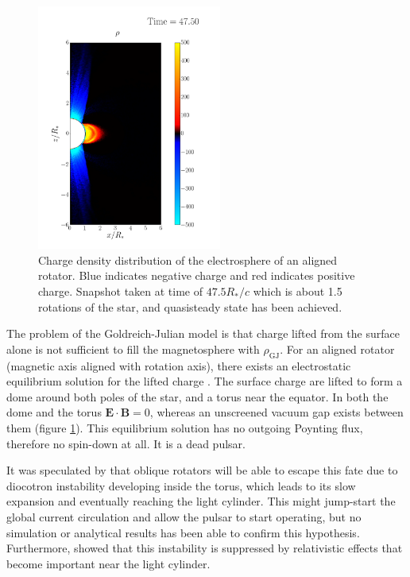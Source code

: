 \begin{figure}[h]
  \centering
  \includegraphics[width=0.54\textwidth]{pics/intro/electrosphere-new.png}
  \caption[Charge density distribution of the electrosphere of an aligned
  rotator.]{Charge density distribution of the electrosphere of an aligned
    rotator. Blue indicates negative charge and red indicates positive charge.
    Snapshot taken at time of $47.5R_{*}/c$ which is about 1.5 rotations of the
    star, and quasisteady state has been achieved.}
  \label{fig:electrosphere-intro}
\end{figure}

The problem of the Goldreich-Julian model is that charge lifted from the
surface alone is not sufficient to fill the magnetosphere with
$\rho_\mathrm{GJ}$. For an aligned rotator (magnetic axis aligned with rotation
axis), there exists an electrostatic equilibrium solution for the lifted charge
\citep{jackson_new_1976, krause-polstorff_pulsar_1985,
  krause-polstorff_electrosphere_1985}. The surface charge are lifted to form a
dome around both poles of the star, and a torus near the equator. In both the
dome and the torus $\mathbf{E}\cdot \mathbf{B} = 0$, whereas an unscreened
vacuum gap exists between them (figure \ref{fig:electrosphere-intro}). This
equilibrium solution has no outgoing Poynting flux, therefore no spin-down at
all. It is a dead pulsar.

It was speculated by \citet{spitkovsky_electrodynamics_2004} that oblique
rotators will be able to escape this fate due to diocotron instability
developing inside the torus, which leads to its slow expansion and eventually
reaching the light cylinder. This might jump-start the global current
circulation and allow the pulsar to start operating, but no simulation or
analytical results has been able to confirm this hypothesis. Furthermore,
\citet{petri_relativistic_2007} showed that this instability is suppressed by
relativistic effects that become important near the light cylinder.

